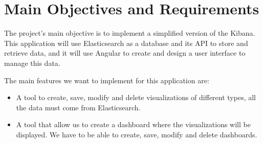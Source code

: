 \documentclass[a4paper, 12pt, english]{book}
\begin{document}



\section{Main Objectives and Requirements}
\label{sec:objectives}

The project's main objective is to implement a simplified version of the Kibana. This application will use Elasticsearch as a database and its API to store and retrieve data, and it will use Angular to create and design a user interface to manage this data.

The main features we want to implement for this application are:
\begin{itemize}
    \item A tool to create, save, modify and delete visualizations of different types, all the data must come from Elasticsearch.
    \item A tool that allow us to create a dashboard where the visualizations will be displayed. We have to be able to create, save, modify and delete dashboards.
\end{itemize}





\end{document}
